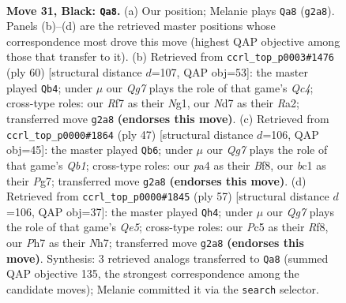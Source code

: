 \documentclass[11pt]{article}
\begin{document}
\clearpage

\begin{figure}[p]\centering
\begin{subfigure}{0.46\textwidth}\centering
\resizebox{\linewidth}{!}{%
\newchessgame
\chessboard[
  setfen={1rb3k1/p2n1r1p/5b2/2p5/Pp1p1P2/1P1Q2N1/R3P1q1/1NB1K2R b - - 9 31},
  showmover=false,
  pgfstyle=straightmove, color=movearrow, markmove={g2-a8}
]}
\caption{}
\end{subfigure}\hfill
\begin{subfigure}{0.46\textwidth}\centering
\resizebox{\linewidth}{!}{%
\newchessgame
\chessboard[
  setfen={2r3k1/pN3p2/6p1/P2Prb1p/2Q1p2q/4P2P/R4n1K/1R3BN1 w - - 1 31},
  showmover=false,
  pgfstyle=straightmove, color=movearrow, markmove={c4-b4}
]}
\caption{}
\end{subfigure}
\\[4pt]
\begin{subfigure}{0.46\textwidth}\centering
\resizebox{\linewidth}{!}{%
\newchessgame
\chessboard[
  setfen={1qr2bk1/R4ppp/3p1n2/3Pp3/2P5/1rNQ2P1/3B1P1P/R5K1 b - - 0 24},
  showmover=false,
  pgfstyle=straightmove, color=movearrow, markmove={b8-b6}
]}
\caption{}
\end{subfigure}\hfill
\begin{subfigure}{0.46\textwidth}\centering
\resizebox{\linewidth}{!}{%
\newchessgame
\chessboard[
  setfen={5rk1/5p1n/3p2pp/1p1N2b1/1Pr1q3/P6P/1B3RP1/R2Q3K b - - 1 29},
  showmover=false,
  pgfstyle=straightmove, color=movearrow, markmove={e4-h4}
]}
\caption{}
\end{subfigure}
\caption{\textbf{Move 31, Black: \texttt{Qa8}.} (a) Our position; Melanie plays \texttt{Qa8} (\texttt{g2a8}). Panels (b)--(d) are the retrieved master positions whose correspondence most drove this move (highest QAP objective among those that transfer to it). (b) Retrieved from \texttt{ccrl\_top\_p0003\#1476} (ply 60) [structural distance $d$=107, QAP obj=53]: the master played \texttt{Qb4}; under $\mu$ our \emph{Qg7} plays the role of that game's \emph{Qc4}; cross-type roles: our \emph{R}f7 as their \emph{N}g1, our \emph{N}d7 as their \emph{R}a2; transferred move \texttt{g2a8} \textbf{(endorses this move)}. (c) Retrieved from \texttt{ccrl\_top\_p0000\#1864} (ply 47) [structural distance $d$=106, QAP obj=45]: the master played \texttt{Qb6}; under $\mu$ our \emph{Qg7} plays the role of that game's \emph{Qb1}; cross-type roles: our \emph{p}a4 as their \emph{B}f8, our \emph{b}c1 as their \emph{P}g7; transferred move \texttt{g2a8} \textbf{(endorses this move)}. (d) Retrieved from \texttt{ccrl\_top\_p0000\#1845} (ply 57) [structural distance $d$=106, QAP obj=37]: the master played \texttt{Qh4}; under $\mu$ our \emph{Qg7} plays the role of that game's \emph{Qe5}; cross-type roles: our \emph{P}c5 as their \emph{R}f8, our \emph{P}h7 as their \emph{N}h7; transferred move \texttt{g2a8} \textbf{(endorses this move)}. Synthesis: 3 retrieved analogs transferred to \texttt{Qa8} (summed QAP objective 135, the strongest correspondence among the candidate moves); Melanie committed it via the \texttt{search} selector.}
\label{fig:thought-m61}
\end{figure}
\end{document}
